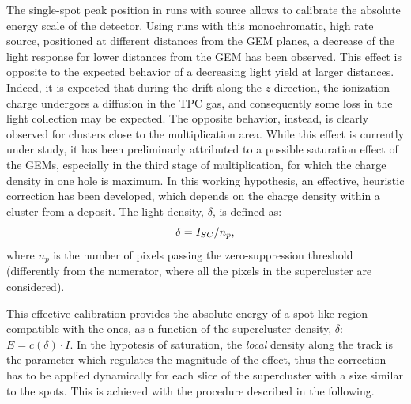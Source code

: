 The single-spot peak position in runs with \fe source allows to
calibrate the absolute energy scale of the \lemon detector. Using runs
with this monochromatic, high rate source, positioned at different
distances from the GEM planes, a decrease of the light response for
lower distances from the GEM has been observed. This effect is
opposite to the expected behavior of a decreasing light yield at
larger distances. Indeed, it is expected that during the drift along
the $z$-direction, the ionization charge undergoes a diffusion in the
TPC gas, and consequently some loss in the light collection may be
expected. The opposite behavior, instead, is clearly observed for \fe
clusters close to the multiplication area. While this effect is
currently under study, it has been preliminarly attributed to a
possible saturation effect of the GEMs, especially in the third stage
of multiplication, for which the charge density in one hole is
maximum.  In this working hypothesis, an effective, heuristic
correction has been developed, which depends on the charge density
within a cluster from a \fe deposit. The light density, $\delta$, is
defined as:
\begin{equation}
  \label{eq:density}
  \delta = I_{SC} / n_p,
\end{equation}
where $n_p$ is the number of pixels passing the zero-suppression
threshold (differently from the numerator, where all the pixels in the
supercluster are considered).

This effective calibration provides the absolute energy of a spot-like
region compatible with the \fe ones, as a function of the supercluster
density, $\delta$: $E=c(\delta)\cdot I$. In the hypotesis of saturation, the
\textit{local} density along the track is the parameter which
regulates the magnitude of the effect, thus the correction has to be
applied dynamically for each slice of the supercluster with a size
similar to the \fe spots.  This is achieved with the procedure
described in the following.

